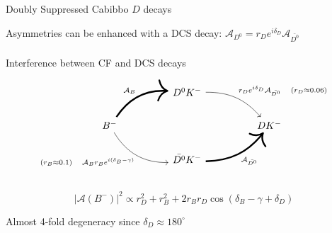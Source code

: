 \documentclass[dvipsnames]{beamer}
\begin{document}
\begin{frame}[fragile]{Doubly Suppressed Cabibbo $D$ decays}
  \begin{center}
    Asymmetries can be enhanced with a DCS decay: $\mathcal{A}_{D^0} = r_De^{i\delta_D}\mathcal{A}_{\bar{D^0}}$\\~\\
    Interference between CF and DCS decays
  \end{center}
  \begin{equation*}
    \begin{tikzcd}[column sep=huge]
      & D^0K^- \arrow[dr, bend left = 25, "r_De^{i\delta_D}\mathcal{A}_{\bar{D^0}}\quad (r_D\approx0.06)"] & \\
      B^- \arrow[ur, bend left, line width = 1.7, "\mathcal{A}_B"] \arrow[dr, bend right, "(r_B\approx0.1)\quad\mathcal{A}_B r_B e^{i(\delta_B - \gamma)}"'] & [5cm] & DK^- \\
      & \bar{D^0}K^- \arrow[ur, bend right = 25, line width = 1.7, "\mathcal{A}_{\bar{D^0}}"'] & \\
    \end{tikzcd}
  \end{equation*}
  \begin{equation*}
    \lvert\mathcal{A}(B^-)\lvert^2\propto r_D^2 + r_B^2 + 2r_Br_D\cos(\delta_B - \gamma + \delta_D)
  \end{equation*}
  \begin{center}
    Almost 4-fold degeneracy since $\delta_D\approx180^\circ$\phantom{$()$}
  \end{center}
\end{frame}
\end{document}
